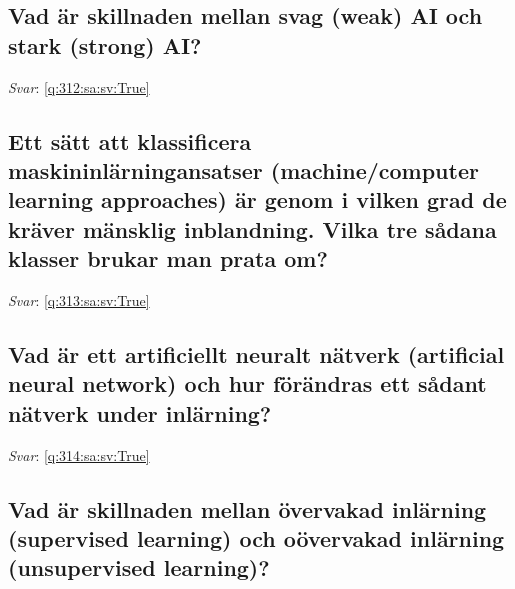 \documentclass[a4paper,11pt,oneside]{article}
\begin{document}
\begin{sloppypar}
\subsection{Vad \"ar skillnaden mellan svag (weak) AI och stark (strong) AI?}

\label{q:312:sa:sv:False}

\vspace{2cm}

\noindent\makebox[\textwidth]{\hrulefill}

\vspace{1cm}

\textit{Svar}: \autoref{q:312:sa:sv:True}



\subsection{Ett s\"att att klassificera maskininl\"arningansatser (machine/computer learning approaches) \"ar genom i vilken grad de kr\"aver m\"ansklig inblandning. Vilka tre s\r{a}dana klasser brukar man prata om?}

\label{q:313:sa:sv:False}

\vspace{2cm}

\noindent\makebox[\textwidth]{\hrulefill}

\vspace{1cm}

\textit{Svar}: \autoref{q:313:sa:sv:True}



\subsection{Vad \"ar ett artificiellt neuralt n\"atverk (artificial neural network) och hur f\"or\"andras ett s\r{a}dant n\"atverk under inl\"arning?}

\label{q:314:sa:sv:False}

\vspace{2cm}

\noindent\makebox[\textwidth]{\hrulefill}

\vspace{1cm}

\textit{Svar}: \autoref{q:314:sa:sv:True}



\subsection{Vad \"ar skillnaden mellan \"overvakad inl\"arning (supervised learning) och o\"overvakad inl\"arning (unsupervised learning)?}


\end{sloppypar}
\end{document}
